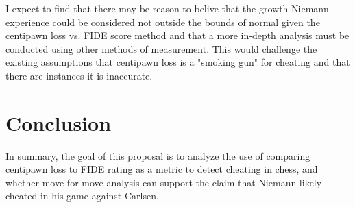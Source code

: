 \documentclass[12pt]{article}
\begin{document}
I expect to find that there may be reason to belive that the growth Niemann experience could be considered 
not outside the bounds of normal given the centipawn loss vs. FIDE score method and that a more in-depth
analysis must be conducted using other methods of measurement. This would challenge the existing assumptions that
centipawn loss is a "smoking gun" for cheating and that there are instances it is inaccurate.

\section*{Conclusion}
\label{sec:conc}

In summary, the goal of this proposal is to analyze the use of comparing centipawn loss to FIDE rating as a metric 
to detect cheating in chess, and whether move-for-move analysis can support the claim that Niemann likely cheated 
in his game against Carlsen.



\end{document}
